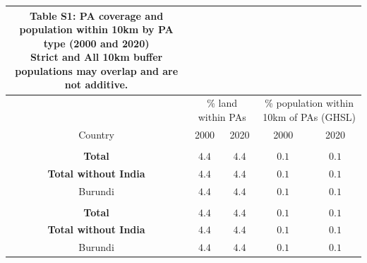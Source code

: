 \begin{longtable}{ccccc}
\caption*{
{\large Table S1: PA coverage and population within 10km by PA type (2000 and 2020)} \\ 
{\small Strict and All 10km buffer populations may overlap and are not additive.}
} \\ 
\toprule
 & \multicolumn{2}{c}{\% land within PAs} & \multicolumn{2}{c}{\% population within 10km of PAs (GHSL)} \\ 
\cmidrule(lr){2-3} \cmidrule(lr){4-5}
Country & 2000 & 2020 & 2000 & 2020 \\ 
\midrule\addlinespace[2.5pt]
\multicolumn{5}{l}{Strict} \\ 
\midrule\addlinespace[2.5pt]
\textbf{Total} & \textbf{$4.4$} & \textbf{$4.4$} & \textbf{$0.1$} & \textbf{$0.1$} \\ 
\textbf{Total without India} & \textbf{$4.4$} & \textbf{$4.4$} & \textbf{$0.1$} & \textbf{$0.1$} \\ 
Burundi & $4.4$ & $4.4$ & $0.1$ & $0.1$ \\ 
\midrule\addlinespace[2.5pt]
\multicolumn{5}{l}{All} \\ 
\midrule\addlinespace[2.5pt]
\textbf{Total} & \textbf{$4.4$} & \textbf{$4.4$} & \textbf{$0.1$} & \textbf{$0.1$} \\ 
\textbf{Total without India} & \textbf{$4.4$} & \textbf{$4.4$} & \textbf{$0.1$} & \textbf{$0.1$} \\ 
Burundi & $4.4$ & $4.4$ & $0.1$ & $0.1$ \\ 
\bottomrule
\end{longtable}

